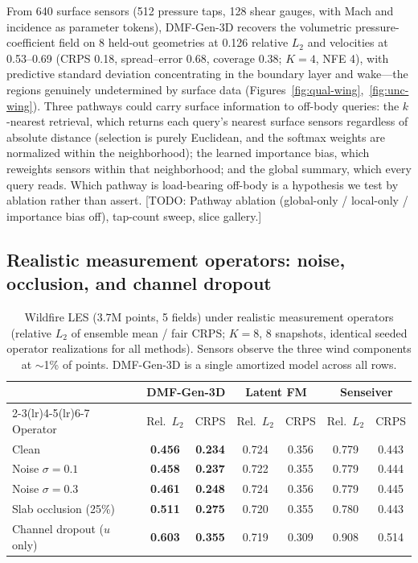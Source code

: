 \documentclass{article} %
\newcommand{\todo}[1]{{\color{red}[TODO: #1]}}
\newcommand{\model}{DMF-Gen-3D}
\begin{document}
From 640 surface sensors (512 pressure taps, 128 shear gauges, with Mach and incidence as parameter tokens), \model{} recovers the volumetric pressure-coefficient field on 8 held-out geometries at 0.126 relative $L_2$ and velocities at 0.53--0.69 (CRPS 0.18, spread--error 0.68, coverage 0.38; $K{=}4$, NFE 4), with predictive standard deviation concentrating in the boundary layer and wake---the regions genuinely undetermined by surface data (Figures~\ref{fig:qual-wing},~\ref{fig:unc-wing}). Three pathways could carry surface information to off-body queries: the $k$-nearest retrieval, which returns each query's nearest surface sensors regardless of absolute distance (selection is purely Euclidean, and the softmax weights are normalized within the neighborhood); the learned importance bias, which reweights sensors within that neighborhood; and the global summary, which every query reads. Which pathway is load-bearing off-body is a hypothesis we test by ablation rather than assert. \todo{Pathway ablation (global-only / local-only / importance bias off), tap-count sweep, slice gallery.}

\subsection{Realistic measurement operators: noise, occlusion, and channel dropout}
\label{sec:results-ops}

\begin{table}[tbp]
\caption{Wildfire LES ($3.7$M points, 5 fields) under realistic measurement operators (relative $L_2$ of ensemble mean / fair CRPS; $K{=}8$, 8 snapshots, identical seeded operator realizations for all methods). Sensors observe the three wind components at $\sim$1\% of points. \model{} is a single amortized model across all rows.}
\label{tab:ops}
\begin{center}
\footnotesize
\setlength{\tabcolsep}{4.5pt}
\begin{tabular}{lcccccc}
\toprule
& \multicolumn{2}{c}{\model{}} & \multicolumn{2}{c}{Latent FM} & \multicolumn{2}{c}{Senseiver} \\
\cmidrule(lr){2-3}\cmidrule(lr){4-5}\cmidrule(lr){6-7}
Operator & Rel.\ $L_2$ & CRPS & Rel.\ $L_2$ & CRPS & Rel.\ $L_2$ & CRPS \\
\midrule
Clean & \textbf{0.456} & \textbf{0.234} & 0.724 & 0.356 & 0.779 & 0.443 \\
Noise $\sigma{=}0.1$ & \textbf{0.458} & \textbf{0.237} & 0.722 & 0.355 & 0.779 & 0.444 \\
Noise $\sigma{=}0.3$ & \textbf{0.461} & \textbf{0.248} & 0.724 & 0.356 & 0.779 & 0.445 \\
Slab occlusion (25\%) & \textbf{0.511} & \textbf{0.275} & 0.720 & 0.355 & 0.780 & 0.443 \\
Channel dropout ($u$ only) & \textbf{0.603} & \textbf{0.355} & 0.719 & 0.309 & 0.908 & 0.514 \\
\bottomrule
\end{tabular}
\end{center}
\end{table}
\end{document}
